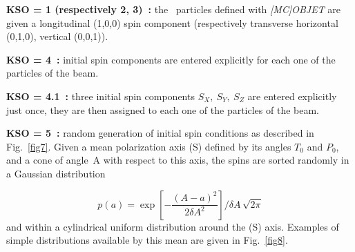 {\noindent\textbf{KSO = 1  (respectively 2, 3)~:} the \IMAX\ particles
 defined with \textsl{[MC]OBJET} are given a longitudinal (1,0,0) spin component (respectively 
transverse horizontal (0,1,0), vertical (0,0,1)).  
\medskip

\noindent\textbf{KSO = 4~:} initial spin components are entered explicitly for
each one of the \IMAX{} particles of the beam.  
\medskip

\noindent\textbf{KSO = 4.1~:} three initial spin components $S_X, ~S_Y, ~S_Z$ are entered explicitly just once, 
they are then assigned to  each one of the \IMAX{} particles of the beam.  
\medskip

\noindent\textbf{KSO = 5~:} random generation of \IMAX{} initial spin
conditions as described in Fig.~\ref{fig7}.  
Given a mean polarization axis (S) defined by its angles $ T_0 $ and $ P_0 $, 
and a cone of angle~A with respect to this axis, the \IMAX{} spins are sorted randomly in a 
Gaussian distribution

$$ p(a) = \exp \left[- \dfrac{(A-a)^2 }{ 2\delta A^2} \right]/ \delta A\,  \sqrt{2\pi}   $$
%
and within a cylindrical uniform distribution around the (S) 
axis. Examples of simple distributions available by this mean are 
given in Fig.~\ref{fig8}.  


}
